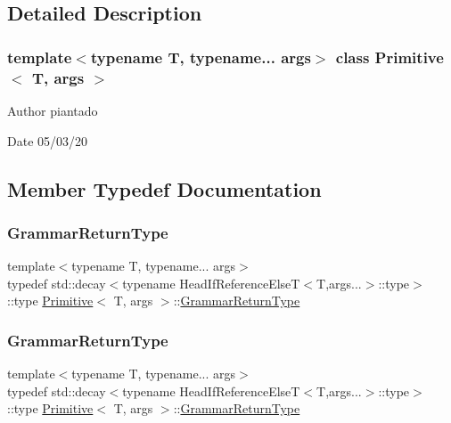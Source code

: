 \subsection{Detailed Description}
\subsubsection*{template$<$typename T, typename... args$>$\newline
class Primitive$<$ T, args $>$}

\begin{DoxyAuthor}{Author}
piantado 
\end{DoxyAuthor}
\begin{DoxyDate}{Date}
05/03/20 
\end{DoxyDate}


\subsection{Member Typedef Documentation}
\mbox{\label{struct_primitive_a1f2d2db3fb7869d03d65112e30d22101}} 
\subsubsection{\texorpdfstring{Grammar\+Return\+Type}{GrammarReturnType}\hspace{0.1cm}{\footnotesize\ttfamily [1/2]}}
{\footnotesize\ttfamily template$<$typename T, typename... args$>$ \\
typedef std\+::decay$<$typename Head\+If\+Reference\+ElseT$<$T,args...$>$\+::type$>$\+::type \hyperlink{struct_primitive}{Primitive}$<$ T, args $>$\+::\hyperlink{struct_primitive_a1f2d2db3fb7869d03d65112e30d22101}{Grammar\+Return\+Type}}

\mbox{\label{struct_primitive_a1f2d2db3fb7869d03d65112e30d22101}} 
\subsubsection{\texorpdfstring{Grammar\+Return\+Type}{GrammarReturnType}\hspace{0.1cm}{\footnotesize\ttfamily [2/2]}}
{\footnotesize\ttfamily template$<$typename T, typename... args$>$ \\
typedef std\+::decay$<$typename Head\+If\+Reference\+ElseT$<$T,args...$>$\+::type$>$\+::type \hyperlink{struct_primitive}{Primitive}$<$ T, args $>$\+::\hyperlink{struct_primitive_a1f2d2db3fb7869d03d65112e30d22101}{Grammar\+Return\+Type}}



